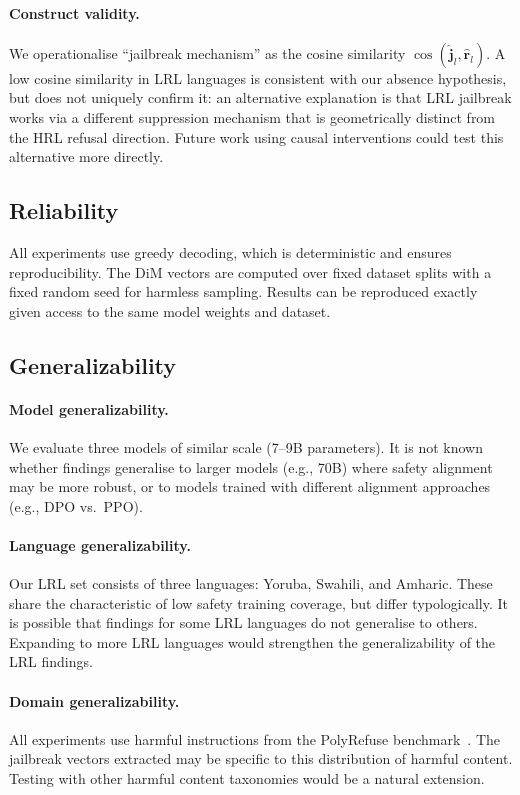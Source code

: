 \paragraph{Construct validity.}
We operationalise ``jailbreak mechanism'' as the cosine similarity $\cos(\hat{\mathbf{j}}_l, \hat{\mathbf{r}}_l)$. A low cosine similarity in LRL languages is consistent with our absence hypothesis, but does not uniquely confirm it: an alternative explanation is that LRL jailbreak works via a different suppression mechanism that is geometrically distinct from the HRL refusal direction. Future work using causal interventions could test this alternative more directly.

\subsection{Reliability}

All experiments use greedy decoding, which is deterministic and ensures reproducibility. The DiM vectors are computed over fixed dataset splits with a fixed random seed for harmless sampling. Results can be reproduced exactly given access to the same model weights and dataset.

\subsection{Generalizability}

\paragraph{Model generalizability.}
We evaluate three models of similar scale (7--9B parameters). It is not known whether findings generalise to larger models (e.g., 70B) where safety alignment may be more robust, or to models trained with different alignment approaches (e.g., DPO vs.\ PPO).

\paragraph{Language generalizability.}
Our LRL set consists of three languages: Yoruba, Swahili, and Amharic. These share the characteristic of low safety training coverage, but differ typologically. It is possible that findings for some LRL languages do not generalise to others. Expanding to more LRL languages would strengthen the generalizability of the LRL findings.

\paragraph{Domain generalizability.}
All experiments use harmful instructions from the PolyRefuse benchmark~\citep{wang2026refusal}. The jailbreak vectors extracted may be specific to this distribution of harmful content. Testing with other harmful content taxonomies would be a natural extension.

